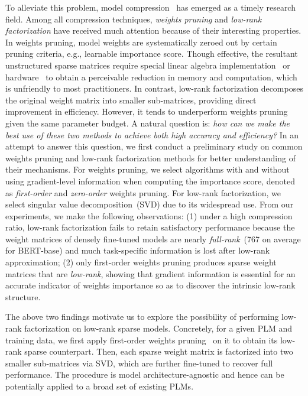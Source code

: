 To alleviate this problem, model compression~\cite{l0,svd} has emerged as a 
timely research field. Among all compression techniques, \textit{weights pruning} 
and \textit{low-rank factorization} have received much attention because of their interesting properties.
In weights pruning, model weights are systematically zeroed out by certain pruning criteria, e.g., learnable importance score. Though effective, the resultant unstructured sparse matrices require special linear algebra implementation~\cite{yao} or hardware~\cite{cao} to obtain a perceivable reduction in memory and computation, which is unfriendly to most practitioners. In contrast, low-rank factorization decomposes the original weight matrix into smaller sub-matrices, providing direct improvement in efficiency. However, it tends to underperform weights pruning given the same parameter budget. A natural question is: \textit{how can we make the best use of these two methods to achieve both high accuracy and efficiency?}
In an attempt to answer this question, we first conduct a preliminary study on common weights pruning and low-rank 
factorization methods for better understanding of their mechanisms. 
For weights pruning, we select algorithms with and without using gradient-level information when computing the importance score, denoted as \textit{first-order} and \textit{zero-order} weights pruning. For low-rank factorization, we select singular value decomposition~(SVD) due to its widespread use. From our experiments, we make the following observations: (1) under a high compression ratio, low-rank factorization fails to retain satisfactory performance because the weight matrices of densely fine-tuned models are nearly \textit{full-rank}~(767 on average for BERT-base) and much task-specific information is lost after low-rank approximation; (2) only first-order weights pruning produces sparse weight matrices that are \textit{low-rank}, showing that gradient information is essential for an accurate indicator of weights importance so as to discover the intrinsic low-rank structure.

The above two findings motivate us to explore the possibility of performing low-rank factorization on low-rank sparse models. Concretely, for a given PLM and training data, we first apply first-order weights pruning~\cite{movement} on it to obtain its low-rank sparse counterpart. Then, each sparse weight matrix is factorized into two smaller sub-matrices via SVD, which are further fine-tuned to recover full performance. The procedure is 
model architecture-agnostic and hence can be potentially applied to a broad set of existing PLMs. 

